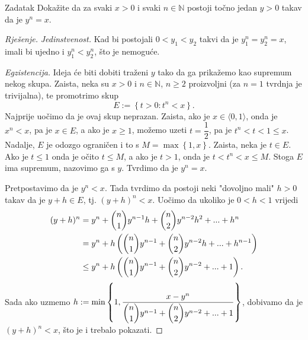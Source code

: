 \begin{exercise}{Zadatak}
Dokažite da za svaki $x>0$ i svaki $n\in \mathbb{N}$ postoji točno jedan $y>0$ takav da je $y^n=x$.
\end{exercise}
\begin{proof}[Rješenje]
\textit{Jedinstvenost.} Kad bi postojali $0<y_1<y_2$ takvi da je $y_1^n=y_2^n=x$, imali bi ujedno i $y_1^n<y_2^n$, što je nemoguće.

\textit{Egzistencija.} Ideja će biti dobiti traženi $y$ tako da ga prikažemo kao supremum nekog skupa. Zaista, neka su $x>0$ i $n\in \mathbb{N}$, $n\geq 2$ proizvoljni (za $n=1$ tvrdnja je trivijalna), te promotrimo skup
$$E:=\left\{ t>0 : t^n<x\right\}.$$
Najprije uočimo da je ovaj skup neprazan. Zaista, ako je $x\in \langle 0, 1\rangle$, onda je $x^n<x$, pa je $x\in E$, a ako je $x\geq 1$, možemo uzeti $t=\dfrac{1}{2}$, pa je $t^n<t< 1\leq x$. Nadalje, $E$ je odozgo ograničen i to s $M=\max\left\{1, x\right\}$. Zaista, neka je $t\in E$. Ako je $t\leq 1$ onda je očito $t\leq M$, a ako je $t>1$, onda je $t< t^n<x\leq M$. Stoga $E$ ima supremum, nazovimo ga s $y$. Tvrdimo da je $y^n=x$.

Pretpostavimo da je $y^n<x$. Tada tvrdimo da postoji neki "dovoljno mali" $h>0$ takav da je $y+h\in E$, tj. $(y+h)^n<x$. Uočimo da ukoliko je $0<h<1$ vrijedi
\begin{align*}
(y+h)^n&=y^n+\dbinom{n}{1}y^{n-1}h+\dbinom{n}{2}y^{n-2}h^2+...+h^n\\
&=y^n+h\left(\dbinom{n}{1}y^{n-1}+\dbinom{n}{2}y^{n-2}h+...+h^{n-1}\right)\\
&\leq y^n+h\left(\dbinom{n}{1}y^{n-1}+\dbinom{n}{2}y^{n-2}+...+1\right).
\end{align*}
Sada ako uzmemo
$h:=\min\left\{1, \dfrac{x-y^n}{\dbinom{n}{1}y^{n-1}+\dbinom{n}{2}y^{n-2}+...+1}\right\}$,
dobivamo da je $(y+h)^n<x$, što je i trebalo pokazati.


\end{proof}
